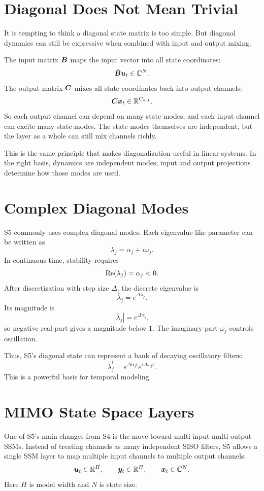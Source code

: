 \section{Diagonal Does Not Mean Trivial}

It is tempting to think a diagonal state matrix is too simple. But diagonal dynamics can
still be expressive when combined with input and output mixing.

The input matrix $\bar{\bm{B}}$ maps the input vector into all state coordinates:
\[
  \bar{\bm{B}}\bm{u}_t \in \mathbb{C}^N.
\]
The output matrix $\bm{C}$ mixes all state coordinates back into output channels:
\[
  \bm{C}\bm{x}_t \in \mathbb{R}^{C_{\mathrm{out}}}.
\]
So each output channel can depend on many state modes, and each input channel can excite
many state modes. The state modes themselves are independent, but the layer as a whole
can still mix channels richly.

This is the same principle that makes diagonalization useful in linear systems. In the
right basis, dynamics are independent modes; input and output projections determine how
those modes are used.

\section{Complex Diagonal Modes}

S5 commonly uses complex diagonal modes. Each eigenvalue-like parameter can be written as
\[
  \lambda_j = \alpha_j + i\omega_j.
\]
In continuous time, stability requires
\[
  \operatorname{Re}(\lambda_j)=\alpha_j < 0.
\]
After discretization with step size $\Delta$, the discrete eigenvalue is
\[
  \bar{\lambda}_j = e^{\Delta \lambda_j}.
\]
Its magnitude is
\[
  |\bar{\lambda}_j| = e^{\Delta \alpha_j},
\]
so negative real part gives a magnitude below $1$. The imaginary part $\omega_j$ controls
oscillation.

Thus, S5's diagonal state can represent a bank of decaying oscillatory filters:
\[
  \bar{\lambda}_j^t
  =
  e^{\Delta \alpha_j t} e^{i\Delta\omega_j t}.
\]
This is a powerful basis for temporal modeling.

\section{MIMO State Space Layers}

One of S5's main changes from S4 is the move toward multi-input multi-output SSMs. Instead
of treating channels as many independent SISO filters, S5 allows a single SSM layer to map
multiple input channels to multiple output channels:
\[
  \bm{u}_t \in \mathbb{R}^{H},
  \qquad
  \bm{y}_t \in \mathbb{R}^{H},
  \qquad
  \bm{x}_t \in \mathbb{C}^N.
\]
Here $H$ is model width and $N$ is state size.

